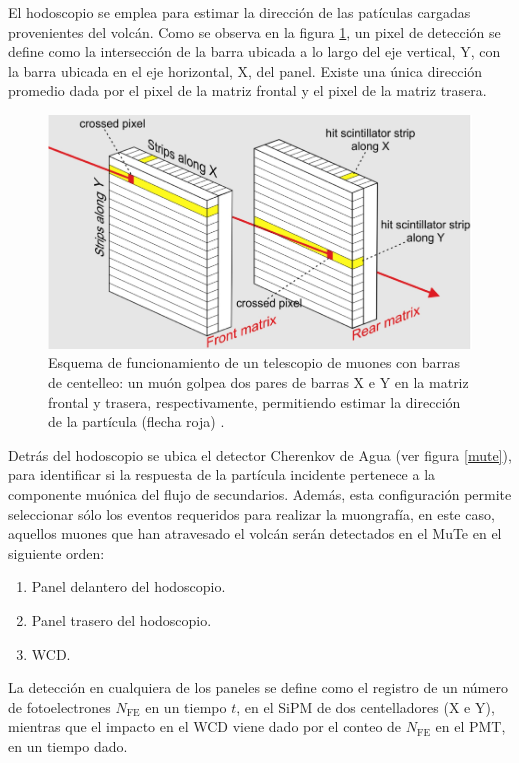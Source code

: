 \documentclass[12pt,oneside,openany,letter]{book}
\begin{document}
El hodoscopio se emplea para estimar la dirección de las pat\'iculas cargadas provenientes del volcán. Como se observa en la figura \ref{pixels}, un pixel de detección se define como la intersección de la barra ubicada a lo largo del eje vertical, Y, con la barra ubicada en el eje horizontal, X, del panel. Existe una única dirección promedio dada por el pixel de la matriz frontal y el pixel de la matriz trasera. 
\begin{figure}[h!]
    \centering        \includegraphics[scale=0.5]{images/pixels.png}
   \caption[Esquema de funcionamiento de un hodoscopio de muones con barras de centelleo]{Esquema de funcionamiento de un telescopio de muones con barras de centelleo: un muón golpea dos pares de barras X e Y en la matriz frontal y trasera, respectivamente, permitiendo estimar la dirección de la partícula (flecha roja) \cite{Carbone-etal2014}.}\label{pixels}
\end{figure}

Detrás del hodoscopio se ubica el detector Cherenkov de Agua (ver figura \ref{mute}), para identificar si la respuesta de la part\'icula incidente pertenece a la componente mu\'onica del flujo de secundarios. Además, esta configuraci\'on permite seleccionar s\'olo los eventos requeridos para realizar la muongraf\'ia, en este caso, aquellos muones que han atravesado el volc\'an ser\'an detectados en el MuTe en el siguiente orden:
\begin{enumerate}
\item Panel delantero del hodoscopio.
\item Panel trasero del hodoscopio.
\item WCD.
\end{enumerate}
La detecci\'on en cualquiera de los paneles se define como el registro de un número de fotoelectrones $N_\mathrm{FE}$ en un tiempo $t$, en el SiPM de dos centelladores (X e Y), mientras que el impacto en el WCD viene dado por el conteo de $N_\mathrm{FE}$ en el PMT, en un tiempo dado.
\end{document}
